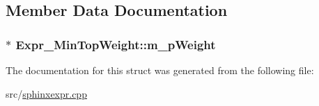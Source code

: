 \subsection{Member Data Documentation}
\hypertarget{structExpr__MinTopWeight_a709be569768f56d5082dfd94fb5cc387}{
\subsubsection[{m\-\_\-p\-Weight}]{$\ast$ Expr\-\_\-\-Min\-Top\-Weight\-::m\-\_\-p\-Weight}}\label{structExpr__MinTopWeight_a709be569768f56d5082dfd94fb5cc387}


The documentation for this struct was generated from the following file\-:\begin{DoxyCompactItemize}
\item 
src/\hyperlink{sphinxexpr_8cpp}{sphinxexpr.\-cpp}\end{DoxyCompactItemize}
